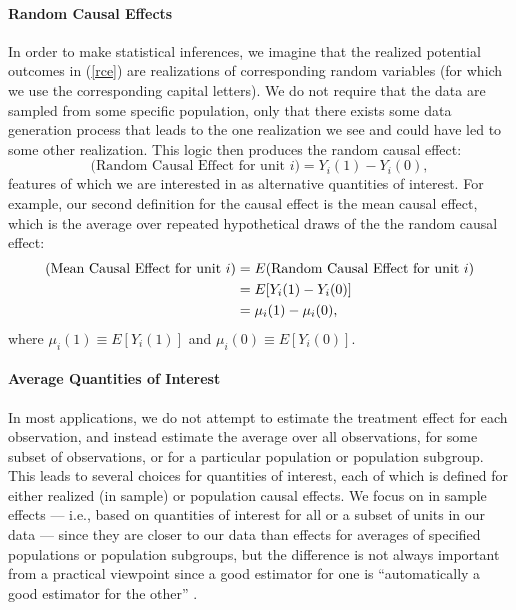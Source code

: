 \documentclass[11pt,titlepage]{article}
\begin{document}
\paragraph{Random Causal Effects} In order to make statistical
inferences, we imagine that the realized potential outcomes in
(\ref{rce}) are realizations of corresponding random variables (for
which we use the corresponding capital letters).  We do not require
that the data are sampled from some specific population, only that
there exists some data generation process that leads to the one
realization we see and could have led to some other realization.  This
logic then produces the random causal effect:
\begin{equation}
  \label{rance}
  \text{(Random Causal Effect for unit $i$)}  = Y_i(1) - Y_i(0),
\end{equation}
features of which we are interested in as alternative quantities of
interest.  For example, our second definition for the causal effect is
the mean causal effect, which is the average over repeated
hypothetical draws of the the random causal effect:
\begin{align}
  \label{meance} \text{(Mean Causal Effect for unit $i$)}
  &= E(\text{Random Causal Effect for unit $i$})\\
  &= E[Y_i(1) - Y_i(0)]\\ \notag &= \mu_i(1) - \mu_i(0),
\end{align}
where $\mu_i(1)\equiv E[Y_i(1)]$ and $\mu_i(0)\equiv E[Y_i(0)]$.

\paragraph{Average Quantities of Interest}
In most applications, we do not attempt to estimate the treatment
effect for each observation, and instead estimate the average over all
observations, for some subset of observations, or for a particular
population or population subgroup.  This leads to several choices for
quantities of interest, each of which is defined for either realized (in
sample) or population causal effects.  We focus on in sample effects
--- i.e., based on quantities of interest for all or a subset of units
in our data --- since they are closer to our data than effects for
averages of specified populations or population subgroups, but the
difference is not always important from a practical viewpoint since a
good estimator for one is ``automatically a good estimator for the
other'' \citep[p.6][]{Imbens04}.
\end{document}
